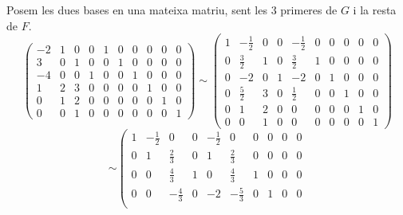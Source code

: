 \documentclass[a4paper, 12pt]{article}
\begin{document}
    \begin{solucio}
        Posem les dues bases en una mateixa matriu, sent les 3 primeres de $G$ i la resta de $F$.
        \begin{displaymath}
            \left(
                \begin{array}{cccc|cccccc}
                    -2 & 1 & 0 & 0 & 1 & 0 & 0 & 0 & 0 & 0\\
                    3 & 0 & 1 & 0 & 0 & 1 & 0 & 0 & 0 & 0\\
                    -4 & 0 & 0 & 1 & 0 & 0 & 1 & 0 & 0 & 0\\
                    \hline
                    1 & 2 & 3 & 0 & 0 & 0 & 0 & 1 & 0 & 0\\
                    0 & 1 & 2 & 0 & 0 & 0 & 0 & 0 & 1 & 0\\
                    0 & 0 & 1 & 0 & 0 & 0 & 0 & 0 & 0 & 1
                \end{array}
            \right)
            \sim
            \left(
                \begin{array}{cccc|cccccc}
                    1 & -\frac{1}{2} & 0 & 0 & -\frac{1}{2} & 0 & 0 & 0 & 0 & 0\\
                    0 & \frac{3}{2} & 1 & 0 & \frac{3}{2} & 1 & 0 & 0 & 0 & 0\\
                    0 & -2 & 0 & 1 & -2 & 0 & 1 & 0 & 0 & 0\\
                    \hline
                    0 & \frac{5}{2} & 3 & 0 & \frac{1}{2} & 0 & 0 & 1 & 0 & 0\\
                    0 & 1 & 2 & 0 & 0 & 0 & 0 & 0 & 1 & 0\\
                    0 & 0 & 1 & 0 & 0 & 0 & 0 & 0 & 0 & 1
                \end{array}
            \right)
        \end{displaymath}
        \begin{displaymath}
            \sim
            \left(
                \begin{array}{cccc|cccccc}
                    1 & -\frac{1}{2} & 0 & 0 & -\frac{1}{2} & 0 & 0 & 0 & 0 & 0\\
                    0 & 1 & \frac{2}{3} & 0 & 1 & \frac{2}{3} & 0 & 0 & 0 & 0\\
                    0 & 0 & \frac{4}{3} & 1 & 0 & \frac{4}{3} & 1 & 0 & 0 & 0\\
                    \hline
                    0 & 0 & -\frac{4}{3} & 0 & -2 & -\frac{5}{3} & 0 & 1 & 0 & 0\\

\end{array}
\end{displaymath}
\end{solucio}
\end{document}
